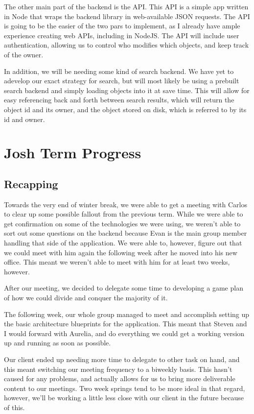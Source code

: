 \documentclass[onecolumn, draftclsnofoot,10pt, compsoc]{IEEEtran}
\begin{document}
The other main part of the backend is the API. This API is a simple app written
in Node that wraps the backend library in web-available JSON requests. The API
is going to be the easier of the two pars to implement, as I already have ample
experience creating web APIs, including in NodeJS. The API will include user
authentication, allowing us to control who modifies which objects, and keep
track of the owner.

In addition, we will be needing some kind of search backend. We have yet to
adevelop our exact strategy for search, but will most likely be using a prebuilt
search backend and simply loading objects into it at save time. This will allow
for easy referencing back and forth between search results, which will return
the object id and its owner, and the object stored on disk, which is referred to
by its id and owner.

\section{Josh Term Progress}
\subsection{Recapping}
Towards the very end of winter break, we were able to get a meeting with Carlos to clear
up some possible fallout from the previous term. While we were able to get
confirmation on some of the technologies we were using, we weren't able to sort out some
questions on the backend because Evan is the main group member handling that side of the
application. We were able to, however, figure out that we could meet with
him again the following week after he moved into his new office. This meant we weren't
able to meet with him for at least two weeks, however.

After our meeting, we decided to delegate some time to developing a game plan of how we
could divide and conquer the majority of it.

The following week, our whole group managed to meet and accomplish setting up the basic
architecture blueprints for the application. This meant that Steven and I would forward
with Aurelia, and do everything we could get a working version up and running as soon
as possible.

Our client ended up needing more time to delegate to other task on hand, and this meant
switching our meeting frequency to a biweekly basis. This hasn't caused for any problems,
and actually allows for us to bring more deliverable content to our meetings. Two week
springs tend to be more ideal in that regard, however, we'll be working a little less
close with our client in the future because of this.
\end{document}
